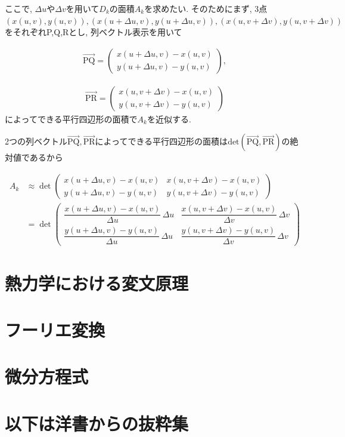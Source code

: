 \documentclass[a4paper,12pt]{jlreq}
\begin{document}
ここで, $\Delta u$や$\Delta v$を用いて$D_k$の面積$A_k$を求めたい. そのためにまず, 3点$(x(u,v),y(u,v)), (x(u + \Delta u, v), y(u + \Delta u, v)), (x(u,v + \Delta v),y(u, v + \Delta v))$をそれぞれP,Q,Rとし, 列ベクトル表示を用いて

\begin{align}
  \overrightarrow{\text{PQ}} = 
  \begin{pmatrix}
    x(u + \Delta u, v) - x(u,v) \\
    y(u + \Delta u, v) - y(u,v)
  \end{pmatrix},
\end{align}

\begin{align}
  \overrightarrow{\text{PR}} =
  \begin{pmatrix}
    x(u, v + \Delta v) - x(u,v) \\
    y(u, v + \Delta v) - y(u,v)
  \end{pmatrix}
\end{align}
によってできる平行四辺形の面積で$A_k$を近似する. \par

2つの列ベクトル$\overrightarrow{\text{PQ}}, \overrightarrow{\text{PR}}$によってできる平行四辺形の面積は$\text{det} (\overrightarrow{\text{PQ}}, \overrightarrow{\text{PR}})$の絶対値であるから

\begin{align*}
A_k &\approx 
\det\begin{pmatrix}
x(u+\Delta u, v) - x(u,v) & x(u, v+\Delta v) - x(u,v) \\
y(u+\Delta u, v) - y(u,v) & y(u, v+\Delta v) - y(u,v)
\end{pmatrix} \\[1em]
&= 
\det\begin{pmatrix}
\dfrac{x(u+\Delta u, v) - x(u,v)}{\Delta u} \, \Delta u & 
\dfrac{x(u, v+\Delta v) - x(u,v)}{\Delta v} \, \Delta v \\[1em]
\dfrac{y(u+\Delta u, v) - y(u,v)}{\Delta u} \, \Delta u &
\dfrac{y(u, v+\Delta v) - y(u,v)}{\Delta v} \, \Delta v
\end{pmatrix}
\end{align*}











\section*{熱力学における変文原理}


\section*{フーリエ変換}


\section*{微分方程式}


\section*{以下は洋書からの抜粋集}
\end{document}
